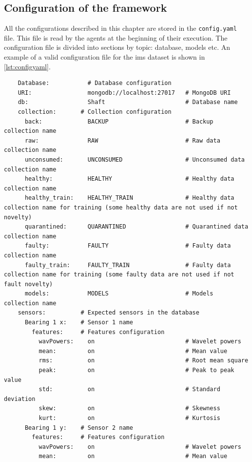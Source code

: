 \subsection{Configuration of the framework}
All the configurations described in this chapter are stored in the \texttt{config.yaml} file. This file is read by the agents at the beginning of their execution. The configuration file is divided into sections by topic: database, models etc. An example of a valid configuration file for the \gls{ims} dataset is shown in \autoref{lst:configyaml}.
\begin{verbatim}
    Database:           # Database configuration
    URI:                mongodb://localhost:27017   # MongoDB URI
    db:                 Shaft                       # Database name
    collection:       # Collection configuration
      back:             BACKUP                      # Backup collection name
      raw:              RAW                         # Raw data collection name
      unconsumed:       UNCONSUMED                  # Unconsumed data collection name
      healthy:          HEALTHY                     # Healthy data collection name
      healthy_train:    HEALTHY_TRAIN               # Healthy data collection name for training (some healthy data are not used if not novelty)
      quarantined:      QUARANTINED                 # Quarantined data collection name
      faulty:           FAULTY                      # Faulty data collection name
      faulty_train:     FAULTY_TRAIN                # Faulty data collection name for training (some faulty data are not used if not fault novelty)
      models:           MODELS                      # Models collection name
    sensors:          # Expected sensors in the database
      Bearing 1 x:    # Sensor 1 name
        features:     # Features configuration
          wavPowers:    on                          # Wavelet powers
          mean:         on                          # Mean value
          rms:          on                          # Root mean square
          peak:         on                          # Peak to peak value
          std:          on                          # Standard deviation
          skew:         on                          # Skewness
          kurt:         on                          # Kurtosis
      Bearing 1 y:    # Sensor 2 name
        features:     # Features configuration
          wavPowers:    on                          # Wavelet powers
          mean:         on                          # Mean value

\end{verbatim}
